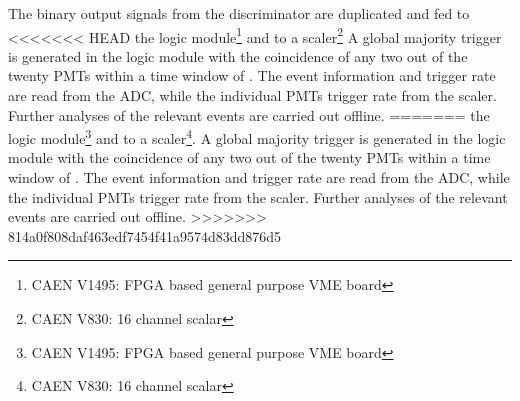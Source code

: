 The binary output signals from the discriminator are duplicated and fed to 
<<<<<<< HEAD
the logic module\footnote{CAEN V1495: FPGA based general purpose VME board} and to a scaler\footnote{CAEN V830: 16 channel scalar} 
A global majority trigger is generated in the logic module with the coincidence of any two out of 
the twenty PMTs within a time window of . The event information and trigger rate are read from the ADC, while the 
individual PMTs trigger rate from the scaler. Further analyses of the relevant events are carried out offline.
=======
the logic module\footnote{CAEN V1495: FPGA based general purpose VME board} and to a scaler\footnote{CAEN V830: 16 channel scalar}. 
A global majority trigger is generated in the logic module with the coincidence of any two out of the twenty PMTs within a time window of . The event information and trigger rate are read from the ADC, while the individual PMTs trigger rate from the scaler. Further analyses of the relevant events are carried out offline.
>>>>>>> 814a0f808daf463edf7454f41a9574d83dd876d5










